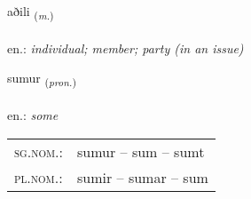 \documentclass[frontgrid, backgrid]{flacards}\usepackage[]{graphicx}\usepackage[]{xcolor}
\begin{document}
\renewcommand{\blhead}{\vskip5pt {\small\bfseries\footnotesize Nafnorð | Noun }}
\renewcommand{\bcfoot}{\vskip5pt \hspace{2pt}{\small\bfseries\footnotesize 1K}}


{aðili \small{\textsubscript{(\textit{m.})}} \\[1ex] %
\textphonetic{[aːðɪlɪ]} \\
en.: \emph{individual; member; party (in an issue)} \\  [2ex]
\renewcommand*{\arraystretch}{0.8}
}

\renewcommand{\flhead}{\vskip5pt \fboxsep=0pt {\small\bfseries\footnotesize Fornafn | Pronoun}}
\renewcommand{\fcfoot}{\vskip5pt \fboxsep=0pt \hspace{2pt}{\small\bfseries\footnotesize 1K}}

\renewcommand{\blhead}{\vskip5pt {\small\bfseries\footnotesize Fornafn | Pronoun }}
\renewcommand{\bcfoot}{\vskip5pt \hspace{2pt}{\small\bfseries\footnotesize 1K}}


{sumur \small{\textsubscript{(\textit{pron.})}} \\[1ex] %
\textphonetic{[sʏːmʏr]} \\
en.: \emph{some} \\  [2ex]
\renewcommand*{\arraystretch}{0.8}
\begin{tabular}{ll}
\textsc{sg.nom.}: & sumur  --  sum -- sumt \\ 
\textsc{pl.nom.}: & sumir -- sumar -- sum
\end{tabular}
}

\renewcommand{\flhead}{\vskip5pt \fboxsep=0pt {\small\bfseries\footnotesize Sagnorð | Verb}}
\renewcommand{\fcfoot}{\vskip5pt \fboxsep=0pt \hspace{2pt}{\small\bfseries\footnotesize 1K}}
\end{document}
